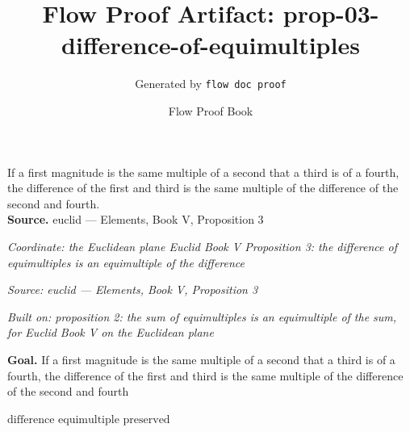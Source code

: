 \documentclass[11pt]{article}
\title{Flow Proof Artifact: prop-03-difference-of-equimultiples}
\author{Generated by \texttt{flow doc proof}}
\date{Flow Proof Book}
\theoremstyle{definition}
\begin{document}
\maketitle
If a first magnitude is the same multiple of a second that a third is of a fourth, the difference of the first and third is the same multiple of the difference of the second and fourth.\\[0.5em]
\textbf{Source.} euclid — Elements, Book V, Proposition 3\\[0.5em]
\bigskip
{}\par
\smallskip\noindent\textit{Coordinate: the Euclidean plane \cdot Euclid Book V \cdot Proposition 3: the difference of equimultiples is an equimultiple of the difference}\par
\smallskip\noindent\textit{Source: euclid — Elements, Book V, Proposition 3}\par
\smallskip\noindent\textit{Built on: proposition 2: the sum of equimultiples is an equimultiple of the sum, for Euclid Book V on the Euclidean plane}\par
\medskip
\noindent\textbf{Goal.} If a first magnitude is the same multiple of a second that a third is of a fourth, the difference of the first and third is the same multiple of the difference of the second and fourth\par
\noindent$\displaystyle \text{difference equimultiple preserved}$\par
\medskip
\noindent
\end{document}
